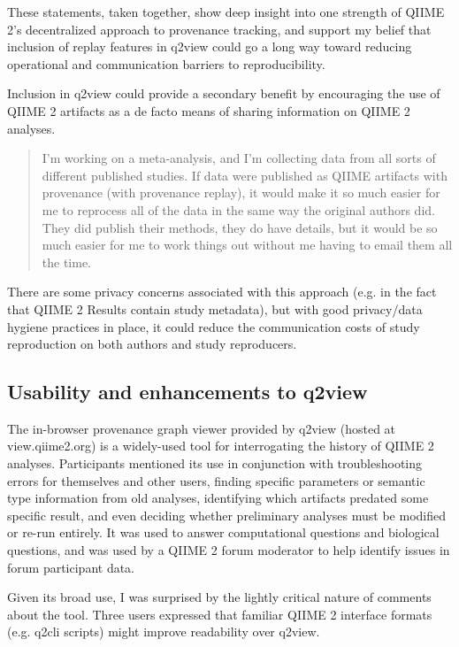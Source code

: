 \noindent These statements, taken together, show deep insight into one strength of QIIME
2’s decentralized approach to provenance tracking, and support my belief that
inclusion of replay features in q2view could go a long way toward reducing
operational and communication barriers to reproducibility. 

Inclusion in q2view could provide a secondary benefit by encouraging the use of
QIIME 2 artifacts as a de facto means of sharing information on QIIME 2 analyses.

\begin{quote}
I'm working on a meta-analysis, and I'm collecting data from all sorts of
different published studies. If data were published as QIIME artifacts with
provenance (with provenance replay), it would make it so much easier for me to
reprocess all of the data in the same way the original authors did. They did
publish their methods, they do have details, but it would be so much easier for
me to work things out without me having to email them all the time.
\end{quote}

\noindent There are some privacy concerns associated with this approach (e.g. in the fact
that QIIME 2 Results contain study metadata), but with good privacy/data hygiene
practices in place, it could reduce the communication costs of study
reproduction on both authors and study reproducers.

\subsection{Usability and enhancements to q2view}
\label{section:q2view_enh}

The in-browser provenance graph viewer provided by q2view (hosted at
view.qiime2.org) is a widely-used tool for interrogating the history of QIIME 2
analyses. Participants mentioned its use in conjunction with troubleshooting
errors for themselves and other users, finding specific parameters or semantic
type information from old analyses, identifying which artifacts predated some
specific result, and even deciding whether preliminary analyses must be modified
or re-run entirely. It was used to answer computational questions and biological
questions, and was used by a QIIME 2 forum moderator to help identify issues in
forum participant data.

Given its broad use, I was surprised by the lightly critical nature of comments
about the tool. Three users expressed that familiar QIIME 2 interface formats
(e.g. q2cli scripts) might improve readability over q2view. 

